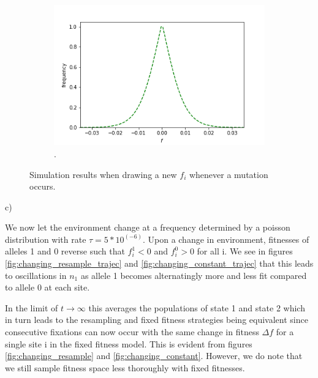 \documentclass{article}
\begin{document}
\begin{figure}[h]
\begin{subfigure}[t]{0.32\linewidth}
		\includegraphics[width = 1.0\linewidth, trim={0 0 0 0}, clip=true]{figures/sym_combined_dists.png}
		.
		\label{fig:simconst}	
	\end{subfigure}
\caption{Simulation results when drawing a new $f_i$ whenever a mutation occurs.}
\label{fig:tree}
\end{figure}


c)

We now let the environment change at a frequency determined by a poisson distribution with rate $\tau = 5*10^(-6)$. Upon a change in environment, fitnesses of alleles 1 and 0 reverse such that $f_i^1 < 0$ and $f_i^0 > 0$ for all i. We see in figures \ref{fig:changing_resample_trajec} and \ref{fig:changing_constant_trajec} that this leads to oscillations in $n_1$ as allele 1 becomes alternatingly more and less fit compared to allele 0 at each site.

In the limit of $t \rightarrow \infty$ this averages the populations of state 1 and state 2 which in turn leads to the resampling and fixed fitness strategies being equivalent since consecutive fixations can now occur with the same change in fitness $\Delta f$ for a single site i in the fixed fitness model. This is evident from figures \ref{fig:changing_resample} and \ref{fig:changing_constant}.
However, we do note that we still sample fitness space less thoroughly with fixed fitnesses.
\end{document}
